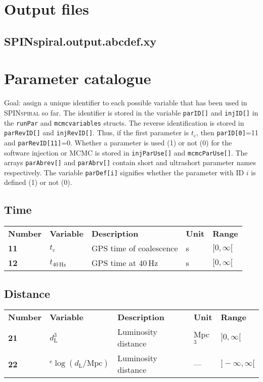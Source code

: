 \documentclass[10pt]{article}
\begin{document}
\pagebreak
\section{Output files}

\subsection{SPINspiral.output.abcdef.xy}





\pagebreak
\section{Parameter catalogue}
\label{sec:parameter_catalogue}
Goal: assign a unique identifier to each possible variable that has been used in \textsc{SPINspiral} so far.
The identifier is stored in the variable \texttt{parID[]} and \texttt{injID[]} in the \texttt{runPar} and 
\texttt{mcmcvariables} structs.  The reverse identification is stored in \texttt{parRevID[]} and 
\texttt{injRevID[]}.  Thus, if the first parameter is $t_\mathrm{c}$, then \texttt{parID[0]}=11 and
\texttt{parRevID[11]}=0.  Whether a parameter is used (1) or not (0) for the software injection or MCMC 
is stored in \texttt{injParUse[]} and \texttt{mcmcParUse[]}.  The arrays \texttt{parAbrev[]} and 
\texttt{parAbrv[]} contain short and ultrashort parameter names respectively. The variable \texttt{parDef[i]} 
signifies whether the parameter with ID $i$ is defined (1) or not (0).

\subsection{Time}
\begin{tabular}{lllll}
  \textbf{Number} & \textbf{Variable} & \textbf{Description} & \textbf{Unit} & \textbf{Range} \\
  \textbf{11} & $t_\mathrm{c}$        & GPS time of coalescence & s & $[0,\infty[$ \\
  \textbf{12} & $t_\mathrm{40\,Hz}$   & GPS time at 40\,Hz & s & $[0,\infty[$ \\
\end{tabular}

\subsection{Distance}
\begin{tabular}{lllll}
  \textbf{Number} & \textbf{Variable} & \textbf{Description} & \textbf{Unit} & \textbf{Range} \\
  \textbf{21} & $d_\mathrm{L}^3$ & Luminosity distance & Mpc$^3$ & $]0,\infty[$ \\
  \textbf{22} & $^\mathrm{e}\log(d_\mathrm{L}/\mathrm{Mpc})$ & Luminosity distance & --- & $]-\infty,\infty[$ \\
\end{tabular}
\end{document}
